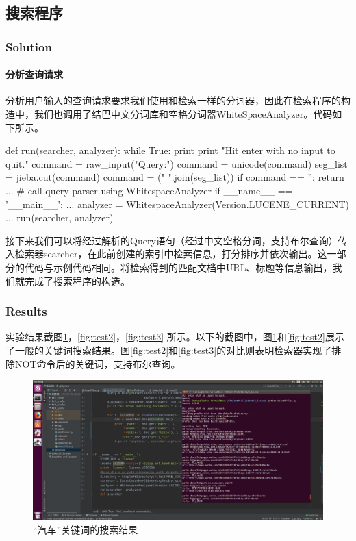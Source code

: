 \documentclass{article}
\begin{document}
\subsection{搜索程序}
\subsubsection{Solution}
\paragraph{分析查询请求}
分析用户输入的查询请求要求我们使用和检索一样的分词器，因此在检索程序的构造中，我们也调用了结巴中文分词库和空格分词器WhiteSpaceAnalyzer。代码如下所示。

\begin{python}
def run(searcher, analyzer):
    while True:
        print
        print "Hit enter with no input to quit."
        command = raw_input("Query:")
        command = unicode(command)
        seg_list = jieba.cut(command)
        command = (" ".join(seg_list))
        if command == '':
            return
        ... # call query parser using WhitespaceAnalyzer
if __name__ == '__main__':
    ...
    analyzer = WhitespaceAnalyzer(Version.LUCENE_CURRENT)
    ...
    run(searcher, analyzer)
    
\end{python}

接下来我们可以将经过解析的Query语句（经过中文空格分词，支持布尔查询）传入检索器searcher，在此前创建的索引中检索信息，打分排序并依次输出。这一部分的代码与示例代码相同。将检索得到的匹配文档中URL、标题等信息输出，我们就完成了搜索程序的构造。

\subsubsection{Results}
实验结果截图\ref{fig:test1}，\ref{fig:test2}，\ref{fig:test3} 所示。以下的截图中，图\ref{fig:test1}和\ref{fig:test2}展示了一般的关键词搜索结果。图\ref{fig:test2}和\ref{fig:test3}的对比则表明检索器实现了排除NOT命令后的关键词，支持布尔查询。

\begin{figure}[htbp]
\centering
\includegraphics[width=14.5cm]{img/test1.png}
\caption{“汽车”关键词的搜索结果}
\label{fig:test1}
\end{figure}
\end{document}
